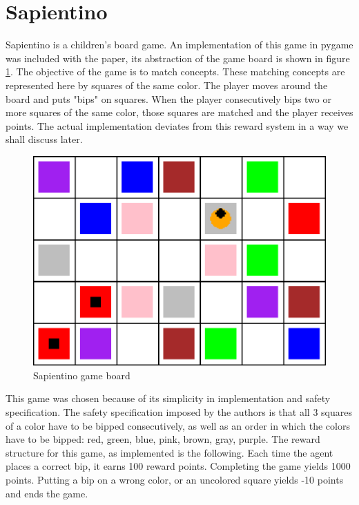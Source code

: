 \documentclass[letterpaper]{article}
\begin{document}
\section{Sapientino} %
Sapientino is a children's board game. An implementation of this game in pygame was included with the paper, its abstraction of the game board is shown in figure \ref{fig:sapientino}. The objective of the game is to match concepts. These matching concepts are represented here by squares of the same color. The player moves around the board and puts "bips" on squares. When the player consecutively bips two or more squares of the same color, those squares are matched and the player receives points. The actual implementation deviates from this reward system in a way we shall discuss later.
\begin{figure}[ht]
    \centering
    \includegraphics[width=.35\textwidth]{figs/sapientino.png}
    \caption{Sapientino game board}
    \label{fig:sapientino}
\end{figure}
\par This game was chosen because of its simplicity in implementation and safety specification. The safety specification imposed by the authors is that all 3 squares of a color have to be bipped consecutively, as well as an order in which the colors have to be bipped: red, green, blue, pink, brown, gray, purple. The reward structure for this game, as implemented is the following. Each time the agent places a correct bip, it earns 100 reward points. Completing the game yields 1000 points. Putting a bip on a wrong color, or an uncolored square yields -10 points and ends the game.
\end{document}
